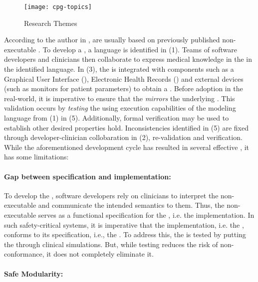 \begin{wrapfigure}{l}{0.5\textwidth}
  \texttt{[image: cpg-topics]}
  \caption{\CGSs{} Research Themes}\label{fig:cpg-research-topics}
\end{wrapfigure}

According to the author in \cite{PelegJBI13}, \CIGs{} are usually based on previously published non-executable
\BPGs{}. To develop a \CIG{}, a language is identified in (1). Teams of
software developers and clinicians then collaborate to express medical knowledge
in the \BPG{} in the identified language. In (3), the \CIG{}
is integrated with components such as a Graphical User
Interface (\GUI{}), Electronic Health Records (\EHRs{}) and external devices
(such as monitors for patient parameters) to obtain a \CGS. Before adoption
in the real-world, it is imperative to ensure that the \CIG{} \emph{mirrors}
the underlying \BPG{}. This validation occurs by \emph{testing} the \CGS{}
using execution capabilities of the modeling language from (1) in (5).
Additionally, formal verification may be used to establish other desired
properties hold. Inconsistencies identified in (5) are fixed through developer-clinician
collobaration in (2),  re-validation and
verification. While the aforementioned development cycle has resulted in several
effective \CGSs{}, it has some limitations:

\paragraph{Gap between specification and implementation:}

To develop the \CIG{}, software developers rely on clinicians to interpret the
non-executable \BPG{} and communicate
the intended semantics to them. Thus, the non-executable \BPG{} serves as a functional specification for
the \CIG{}, i.e. the implementation. In such safety-critical systems, it is
imperative that the implementation, i.e. the \CIG{}, conforms to its
specification, i.e., the \BPG{}. To address this, the \CIG{} is tested by
putting the \CGS{} through clinical simulations. But, while testing reduces
the risk of non-conformance, it does not completely eliminate it.

\paragraph{Safe Modularity:}

